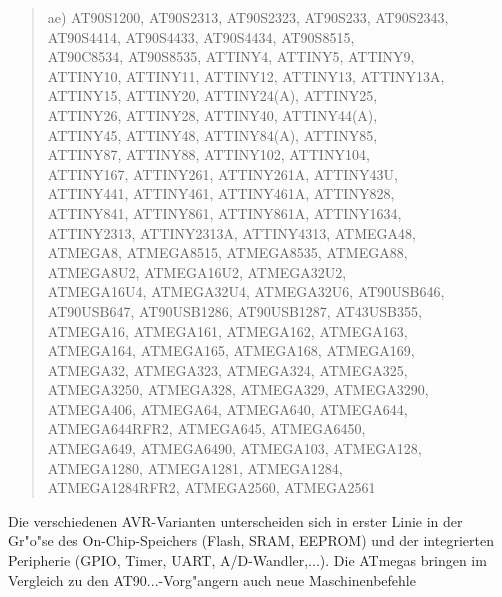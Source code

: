 \documentclass[12pt,a4paper,twoside]{report}
\begin{document}
\begin{quote}
ae) AT90S1200, AT90S2313, AT90S2323, AT90S233, AT90S2343,\\
    AT90S4414, AT90S4433, AT90S4434, AT90S8515,\\
    AT90C8534, AT90S8535, ATTINY4, ATTINY5, ATTINY9,\\
    ATTINY10, ATTINY11, ATTINY12, ATTINY13, ATTINY13A,\\
    ATTINY15, ATTINY20, ATTINY24(A), ATTINY25,\\
    ATTINY26, ATTINY28, ATTINY40, ATTINY44(A),\\
    ATTINY45, ATTINY48, ATTINY84(A), ATTINY85,\\
    ATTINY87, ATTINY88, ATTINY102, ATTINY104,\\
    ATTINY167, ATTINY261, ATTINY261A, ATTINY43U,\\
    ATTINY441, ATTINY461, ATTINY461A, ATTINY828,\\
    ATTINY841, ATTINY861, ATTINY861A, ATTINY1634,\\
    ATTINY2313, ATTINY2313A, ATTINY4313, ATMEGA48,\\
    ATMEGA8, ATMEGA8515, ATMEGA8535, ATMEGA88,\\
    ATMEGA8U2, ATMEGA16U2, ATMEGA32U2,\\
    ATMEGA16U4, ATMEGA32U4, ATMEGA32U6, AT90USB646,\\
    AT90USB647, AT90USB1286, AT90USB1287, AT43USB355,\\
    ATMEGA16, ATMEGA161, ATMEGA162, ATMEGA163,\\
    ATMEGA164, ATMEGA165, ATMEGA168, ATMEGA169,\\
    ATMEGA32, ATMEGA323, ATMEGA324, ATMEGA325,\\
    ATMEGA3250, ATMEGA328, ATMEGA329, ATMEGA3290,\\
    ATMEGA406, ATMEGA64, ATMEGA640, ATMEGA644,\\
    ATMEGA644RFR2, ATMEGA645, ATMEGA6450,\\
    ATMEGA649, ATMEGA6490, ATMEGA103, ATMEGA128,\\
    ATMEGA1280, ATMEGA1281, ATMEGA1284,\\
    ATMEGA1284RFR2, ATMEGA2560, ATMEGA2561
\end{quote}
Die verschiedenen AVR-Varianten unterscheiden sich in erster Linie in
der Gr"o"se des On-Chip-Speichers (Flash, SRAM, EEPROM) und der integrierten
Peripherie (GPIO, Timer, UART, A/D-Wandler,...).  Die ATmegas bringen im
Vergleich zu den AT90...-Vorg"angern auch neue Maschinenbefehle
\end{document}
